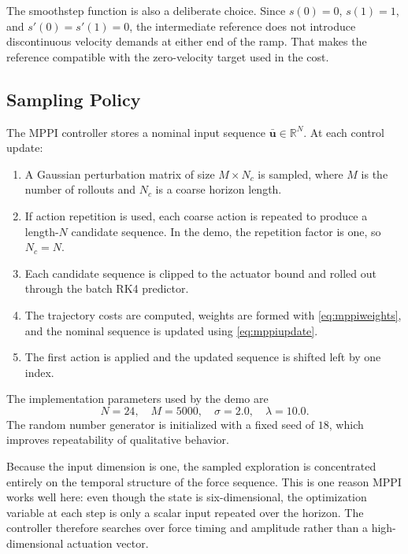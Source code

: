 \documentclass[conference]{IEEEtran}
\begin{document}
The smoothstep function is also a deliberate choice. Since $s(0)=0$, $s(1)=1$, and $s'(0)=s'(1)=0$, the intermediate reference does not introduce discontinuous velocity demands at either end of the ramp. That makes the reference compatible with the zero-velocity target used in the cost.

\subsection{Sampling Policy}
The MPPI controller stores a nominal input sequence $\bar{\bm{u}} \in \mathbb{R}^N$. At each control update:
\begin{enumerate}
\item A Gaussian perturbation matrix of size $M \times N_c$ is sampled, where $M$ is the number of rollouts and $N_c$ is a coarse horizon length.
\item If action repetition is used, each coarse action is repeated to produce a length-$N$ candidate sequence. In the demo, the repetition factor is one, so $N_c=N$.
\item Each candidate sequence is clipped to the actuator bound and rolled out through the batch RK4 predictor.
\item The trajectory costs are computed, weights are formed with \eqref{eq:mppiweights}, and the nominal sequence is updated using \eqref{eq:mppiupdate}.
\item The first action is applied and the updated sequence is shifted left by one index.
\end{enumerate}

The implementation parameters used by the demo are
\begin{equation}
N=24, \quad M=5000, \quad \sigma = 2.0, \quad \lambda = 10.0.
\end{equation}
The random number generator is initialized with a fixed seed of $18$, which improves repeatability of qualitative behavior.

Because the input dimension is one, the sampled exploration is concentrated entirely on the temporal structure of the force sequence. This is one reason MPPI works well here: even though the state is six-dimensional, the optimization variable at each step is only a scalar input repeated over the horizon. The controller therefore searches over force timing and amplitude rather than a high-dimensional actuation vector.
\end{document}
